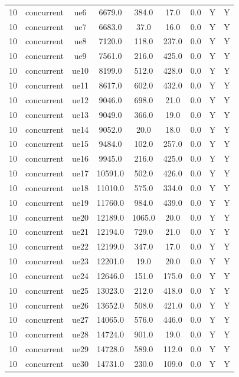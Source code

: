 \begin{table}[ht]
\begin{tabular}{|c|c|c|c|c|c|c|c|c|}
10 & concurrent & ue6 & 6679.0 & 384.0 & 17.0 & 0.0 & Y & Y \\
10 & concurrent & ue7 & 6683.0 & 37.0 & 16.0 & 0.0 & Y & Y \\
10 & concurrent & ue8 & 7120.0 & 118.0 & 237.0 & 0.0 & Y & Y \\
10 & concurrent & ue9 & 7561.0 & 216.0 & 425.0 & 0.0 & Y & Y \\
10 & concurrent & ue10 & 8199.0 & 512.0 & 428.0 & 0.0 & Y & Y \\
10 & concurrent & ue11 & 8617.0 & 602.0 & 432.0 & 0.0 & Y & Y \\
10 & concurrent & ue12 & 9046.0 & 698.0 & 21.0 & 0.0 & Y & Y \\
10 & concurrent & ue13 & 9049.0 & 366.0 & 19.0 & 0.0 & Y & Y \\
10 & concurrent & ue14 & 9052.0 & 20.0 & 18.0 & 0.0 & Y & Y \\
10 & concurrent & ue15 & 9484.0 & 102.0 & 257.0 & 0.0 & Y & Y \\
10 & concurrent & ue16 & 9945.0 & 216.0 & 425.0 & 0.0 & Y & Y \\
10 & concurrent & ue17 & 10591.0 & 502.0 & 426.0 & 0.0 & Y & Y \\
10 & concurrent & ue18 & 11010.0 & 575.0 & 334.0 & 0.0 & Y & Y \\
10 & concurrent & ue19 & 11760.0 & 984.0 & 439.0 & 0.0 & Y & Y \\
10 & concurrent & ue20 & 12189.0 & 1065.0 & 20.0 & 0.0 & Y & Y \\
10 & concurrent & ue21 & 12194.0 & 729.0 & 21.0 & 0.0 & Y & Y \\
10 & concurrent & ue22 & 12199.0 & 347.0 & 17.0 & 0.0 & Y & Y \\
10 & concurrent & ue23 & 12201.0 & 19.0 & 20.0 & 0.0 & Y & Y \\
10 & concurrent & ue24 & 12646.0 & 151.0 & 175.0 & 0.0 & Y & Y \\
10 & concurrent & ue25 & 13023.0 & 212.0 & 418.0 & 0.0 & Y & Y \\
10 & concurrent & ue26 & 13652.0 & 508.0 & 421.0 & 0.0 & Y & Y \\
10 & concurrent & ue27 & 14065.0 & 576.0 & 446.0 & 0.0 & Y & Y \\
10 & concurrent & ue28 & 14724.0 & 901.0 & 19.0 & 0.0 & Y & Y \\
10 & concurrent & ue29 & 14728.0 & 589.0 & 112.0 & 0.0 & Y & Y \\
10 & concurrent & ue30 & 14731.0 & 230.0 & 109.0 & 0.0 & Y & Y \\

\end{tabular}
\end{table}
